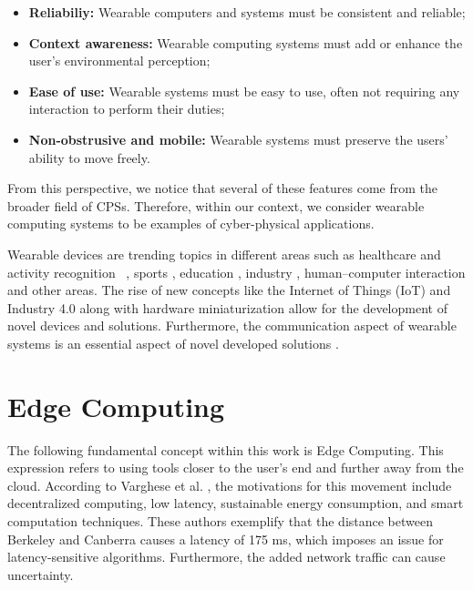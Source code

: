\begin{itemize}
    \item \textbf{Reliabiliy:} Wearable computers and systems must be consistent and reliable;
    \item \textbf{Context awareness:} Wearable computing systems must add or enhance the user's environmental perception;
    \item \textbf{Ease of use:} Wearable systems must be easy to use, often not requiring any interaction to perform their duties;
    \item \textbf{Non-obstrusive and mobile:} Wearable systems must preserve the users' ability to move freely. 
\end{itemize}

From this perspective, we notice that several of these features come from the broader field of CPSs. Therefore, within our context, we consider wearable computing systems to be examples of cyber-physical applications. 

Wearable devices are trending topics in different areas such as healthcare and activity recognition~ \cite{soh2015wearable,risling2017educating,vogenberg2018healthcare, liu2015sensor, zhang2018pea, qiu2018body, pace2018edge}, sports \cite{kaya2019wearable,camomilla2018trends}, education \cite{fu2018trends,chang2018trends}, industry \cite{kong2018industrial,rice2018evaluating}, human--computer interaction \cite{li2018hand} and other areas. The rise of new concepts like the Internet of Things (IoT) \cite{haghi2017wearable,bhatt2017internet,constant2017fog} and Industry 4.0 \cite{kong2018impact} along with hardware miniaturization allow for the development of novel devices and solutions. Furthermore, the communication aspect of wearable systems is an essential aspect of novel developed solutions \cite{kos2019challenges,li2017smartphone}.

\section{Edge Computing}

The following fundamental concept within this work is Edge Computing. This expression refers to using tools closer to the user's end and further away from the cloud. According to Varghese et al. \cite{varghese2016challenges}, the motivations for this movement include decentralized computing, low latency, sustainable energy consumption, and smart computation techniques. These authors exemplify that the distance between Berkeley and Canberra causes a latency of 175 ms, which imposes an issue for latency-sensitive algorithms. Furthermore, the added network traffic can cause uncertainty.

